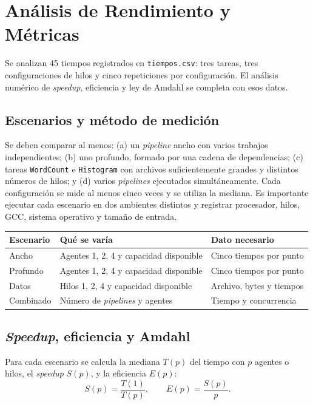 \documentclass[12pt,a4paper]{article}
\newcommand{\code}[1]{\texttt{#1}}
\begin{document}
\section{Análisis de Rendimiento y Métricas}

Se analizan 45 tiempos registrados en \code{tiempos.csv}: tres tareas, tres configuraciones de hilos y cinco repeticiones por configuración. El análisis numérico de \textit{speedup}, eficiencia y ley de Amdahl se completa con esos datos.

\subsection{Escenarios y método de medición}

Se deben comparar al menos: (a) un \textit{pipeline} ancho con varios trabajos independientes; (b) uno profundo, formado por una cadena de dependencias; (c) tareas \code{WordCount} e \code{Histogram} con archivos suficientemente grandes y distintos números de hilos; y (d) varios \textit{pipelines} ejecutados simultáneamente. Cada configuración se mide al menos cinco veces y se utiliza la mediana. Es importante ejecutar cada escenario en dos ambientes distintos y registrar procesador, hilos, GCC, sistema operativo y tamaño de entrada.

\begin{center}
\begin{tabular}{@{}llp{5cm}@{}}
\toprule
\textbf{Escenario} & \textbf{Qué se varía} & \textbf{Dato necesario} \\
\midrule
Ancho & Agentes 1, 2, 4 y capacidad disponible & Cinco tiempos por punto \\
Profundo & Agentes 1, 2, 4 y capacidad disponible & Cinco tiempos por punto \\
Datos & Hilos 1, 2, 4 y capacidad disponible & Archivo, bytes y tiempos \\
Combinado & Número de \textit{pipelines} y agentes & Tiempo y concurrencia \\
\bottomrule
\end{tabular}
\end{center}

\subsection{\textit{Speedup}, eficiencia y Amdahl}

Para cada escenario se calcula la mediana $T(p)$ del tiempo con $p$ agentes o hilos, el \textit{speedup} $S(p)$, y la eficiencia $E(p)$:
\[
S(p) = \frac{T(1)}{T(p)}, \qquad E(p) = \frac{S(p)}{p}.
\]
\end{document}
